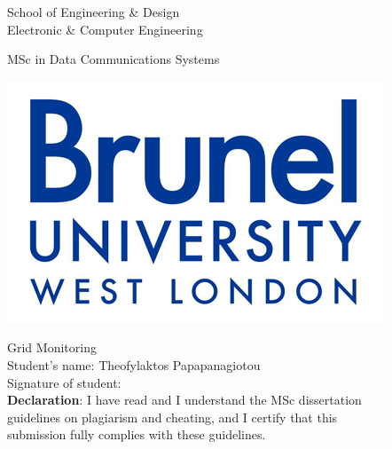 \thispagestyle{empty}

\begin{center}
\Large
School of Engineering \& Design\\
Electronic \& Computer Engineering\\
\vspace{1\baselineskip}

MSc in Data Communications Systems\\
\vspace{1\baselineskip}

\includegraphics{images/brunellogo}\\
\vspace{1\baselineskip}

\Huge
Grid Monitoring\\
\vspace{2\baselineskip}
\Large
Student's name: Theofylaktos Papapanagiotou \\
Signature of student: \\

\vspace{1.8\baselineskip}
\large
{\bf Declaration}: I have read and I understand the MSc dissertation\\
guidelines on plagiarism and cheating, and I certify that this\\
submission fully complies with these guidelines.
\end{center}